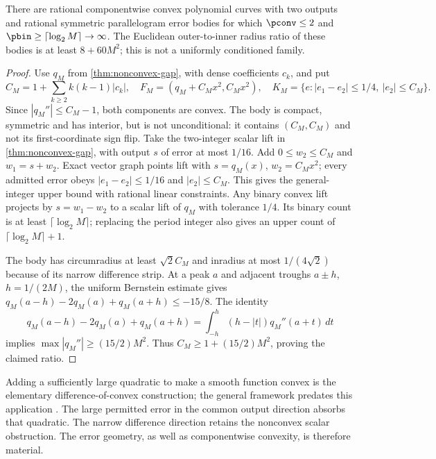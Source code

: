 \begin{proposition}\label{prop:tilted-gap}
There are rational componentwise convex polynomial curves with two outputs
and rational symmetric parallelogram error bodies for which
$\pconv\le2$ and $\pbin\ge\lceil\log_2M\rceil\to\infty$.
The Euclidean outer-to-inner radius ratio of these bodies is at least
$8+60M^2$; this is not a uniformly conditioned family.
\end{proposition}
\begin{proof}
Use $q_M$ from \cref{thm:nonconvex-gap}, with dense coefficients $c_k$,
and put
\[
 C_M=1+\sum_{k\ge2}k(k-1)|c_k|,\quad
 F_M=(q_M+C_Mx^2,C_Mx^2),\quad
 K_M=\{e:|e_1-e_2|\le1/4,\ |e_2|\le C_M\}.
\]
Since $|q_M''|\le C_M-1$, both components are convex. The body is
compact, symmetric and has interior, but is not unconditional: it
contains $(C_M,C_M)$ and not its first-coordinate sign flip.
Take the two-integer scalar lift in \cref{thm:nonconvex-gap}, with
output $s$ of error at most $1/16$. Add $0\le w_2\le C_M$ and
$w_1=s+w_2$. Exact vector graph points lift with
$s=q_M(x)$, $w_2=C_Mx^2$; every admitted error obeys
$|e_1-e_2|\le1/16$ and $|e_2|\le C_M$. This gives the general-integer
upper bound with rational linear constraints.
Any binary convex lift projects by $s=w_1-w_2$ to a scalar lift of
$q_M$ with tolerance $1/4$. Its binary count is at least
$\lceil\log_2M\rceil$; replacing the period integer also gives an
upper count of $\lceil\log_2M\rceil+1$.

The body has circumradius at least $\sqrt2C_M$ and inradius at most
$1/(4\sqrt2)$ because of its narrow difference strip. At a peak $a$
and adjacent troughs $a\pm h$, $h=1/(2M)$, the uniform Bernstein
estimate gives
$q_M(a-h)-2q_M(a)+q_M(a+h)\le-15/8$.
The identity
\[
 q_M(a-h)-2q_M(a)+q_M(a+h)
 =\int_{-h}^h(h-|t|)q_M''(a+t)\,dt
\]
implies $\max|q_M''|\ge(15/2)M^2$. Thus
$C_M\ge1+(15/2)M^2$, proving the claimed ratio.
\end{proof}

Adding a sufficiently large quadratic to make a smooth function convex
is the elementary difference-of-convex construction; the general framework
predates this application \citep{hartman1959}. The large permitted error
in the common output direction absorbs that quadratic. The narrow
difference direction retains the nonconvex scalar obstruction. The error
geometry, as well as componentwise convexity, is therefore material.

